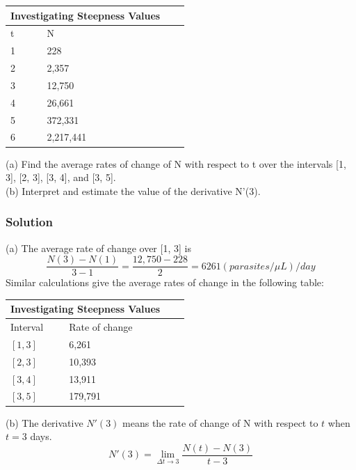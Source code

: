 \begin{center}
	\begin{tabular}{ |p{3cm}||p{3cm}|p{3cm}|p{3cm}|}
 		\hline
 		\multicolumn{2}{|c|}{Investigating Steepness Values} \\
 		\hline
 		t & N\\
 		\hline
 		1    & 228\\
 		2    & 2,357\\
 		3    & 12,750\\
 		4    & 26,661\\
 		5    & 372,331\\
 		6    & 2,217,441\\
 		\hline
	\end{tabular}	
\end{center}


\begin{flushleft}
(a) Find the average rates of change of N with respect to t over the intervals [1, 3], [2, 3], [3, 4], and [3, 5].\\
(b) Interpret and estimate the value of the derivative N'(3).
\end{flushleft}

\subsubsection{Solution}

\begin{flushleft}
(a) The average rate of change over [1, 3] is
$$\frac{N(3) - N(1)}{3 - 1} = \frac{12,750 - 228}{2} = 6261 (parasites/\mu L)/day$$
Similar calculations give the average rates of change in the following table:
\end{flushleft}

\begin{center}
	\begin{tabular}{ |p{3cm}||p{3cm}|p{3cm}|p{3cm}|}
 		\hline
 		\multicolumn{2}{|c|}{Investigating Steepness Values} \\
 		\hline
 		Interval & Rate of change\\
 		\hline
 		$[1, 3]$ & 6,261\\
 		$[2, 3]$ & 10,393\\
 		$[3, 4]$ & 13,911\\
 		$[3, 5]$ & 179,791\\
 		\hline
	\end{tabular}	
\end{center}

\begin{flushleft}
(b) The derivative $N'(3)$ means the rate of change of N with respect to $t$ when $t=3$ days.
	$$
		N'(3) = \lim_{\Delta t \to 3} \frac{N(t) - N(3)}{t - 3}
	$$
\end{flushleft}


